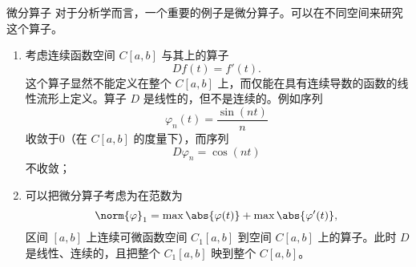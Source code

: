 \begin{example}{微分算子}
对于分析学而言，一个重要的例子是微分算子。可以在不同空间来研究这个算子。

\begin{enumerate}
\item 考虑连续函数空间 $C[a,b]$ 与其上的算子 
\begin{equation}
Df(t)=f'(t).~
\end{equation}
这个算子显然不能定义在整个 $C[a,b]$ 上，而仅能在具有连续导数的函数的线性流形上定义。算子 $D$ 是线性的，但不是连续的。例如序列
\begin{equation}
\varphi_n(t)=\frac{\sin(nt)}{n}~
\end{equation}
收敛于0（在 $C[a,b]$ 的度量下），而序列
\begin{equation}
D\varphi_n=\cos(nt)~
\end{equation}
不收敛；
\item 可以把微分算子考虑为在范数为
\begin{equation}
\norm{\varphi}_1=\max\abs{\varphi(t)}+\max\abs{\varphi'(t)},~
\end{equation}
区间 $[a,b]$ 上连续可微函数空间 $C_1[a,b]$ 到空间 $C[a,b]$ 上的算子。此时 $D$ 是线性、连续的，且把整个 $C_1[a,b]$ 映到整个 $C[a,b]$。
\end{enumerate}

\end{example}



